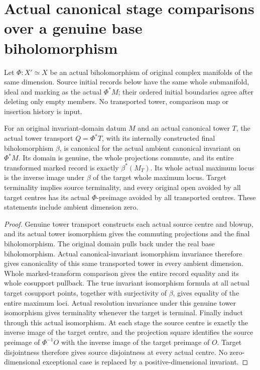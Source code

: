 \section{Actual canonical stage comparisons over a genuine base biholomorphism}

Let $\Phi:X'\simeq X$ be an actual biholomorphism of original complex
manifolds of the same dimension. Source initial records below have the
same whole submanifold, ideal and marking as the actual $\Phi^*M$;
their ordered initial boundaries agree after deleting only empty members.
No transported tower, comparison map or insertion history is input.

\begin{lemma}
\label{hir:original-empty-base-actual-transport-dictionary}
\leanok
For an original invariant-domain datum $M$ and an actual canonical tower
$T$, the actual tower transport $Q=\Phi^*T$, with its internally
constructed final biholomorphism $\beta$, is canonical for the actual
ambient canonical invariant on $\Phi^*M$. Its domain is genuine, the
whole projections commute, and its entire transformed marked record is
exactly $\beta^*(M_T)$. Its whole actual maximum locus is the inverse
image under $\beta$ of the target whole maximum locus. Target terminality
implies source terminality, and every original open avoided by all target
centres has its actual $\Phi$-preimage avoided by all transported centres.
These statements include ambient dimension zero.
\end{lemma}
\begin{proof}
Genuine tower transport constructs each actual source centre and blowup,
and its actual tower isomorphism gives the commuting projections and
the final biholomorphism. The original domain pulls back under the real
base biholomorphism. Actual canonical-invariant isomorphism invariance
therefore gives canonicality of this same transported tower in every
ambient dimension. Whole marked-transform comparison gives the entire
record equality and its whole cosupport pullback. The true invariant
isomorphism formula at all actual target cosupport points, together with
surjectivity of $\beta$, gives equality of the entire maximum loci.
Actual resolution invariance under this genuine tower isomorphism gives
terminality whenever the target is terminal. Finally induct through this
actual isomorphism. At each stage the source centre is exactly the inverse
image of the target centre, and the projection square identifies the
source preimage of $\Phi^{-1}O$ with the inverse image of the target
preimage of $O$. Target disjointness therefore gives source disjointness
at every actual centre. No zero-dimensional exceptional case is replaced
by a positive-dimensional invariant.
\end{proof}

